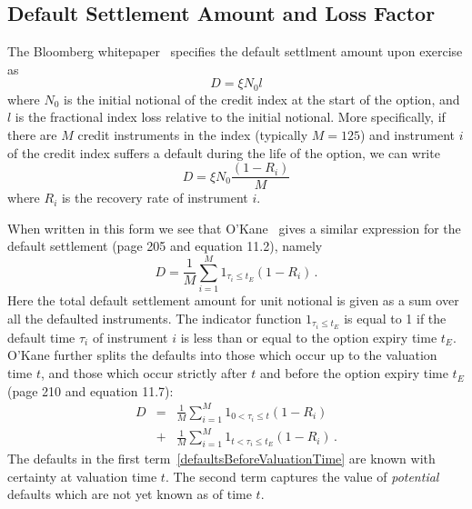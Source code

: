 \documentclass[11pt]{article}
\begin{document}
\subsection{Default Settlement Amount and Loss Factor}

The Bloomberg whitepaper~\cite{BloombergCreditIndexOption} specifies the default settlment amount upon exercise as
\begin{equation}
D = \xi N_0 l
\end{equation}
where $N_0$ is the initial notional of the credit index at the start of the option, and $l$ is the fractional index loss relative to the initial notional. More specifically, if there are $M$ credit instruments in the index (typically $M=125$) and instrument $i$ of the credit index suffers a default during the life of the option, we can write
\begin{equation}
D = \xi N_0 \frac{( 1 - R_i )}{M}
\end{equation}
where $R_i$ is the recovery rate of instrument $i$.


When written in this form we see that O'Kane~\cite{DominicOKane} gives a similar expression for the default settlement (page 205 and equation 11.2), namely
\begin{equation}
D = \frac{1}{M}\sum_{i=1}^M 1_{\tau_i\le t_E}(1-R_i)\,.
\end{equation}
Here the total default settlement amount for unit notional is given as a sum over all the defaulted instruments. The indicator function $1_{\tau_i\le t_E}$ is equal to 1 if the default time $\tau_i$ of instrument $i$ is less than or equal to the option expiry time $t_E$. O'Kane further splits the defaults into those which occur up to the valuation time $t$, and those which occur strictly after $t$ and before the option expiry time $t_E$ (page 210 and equation 11.7):
\begin{eqnarray}
D &=& \frac{1}{M}\sum_{i=1}^M 1_{0<\tau_i\le t}(1-R_i) \label{defaultsBeforeValuationTime}\\
  &+& \frac{1}{M}\sum_{i=1}^M 1_{t<\tau_i\le t_E}(1-R_i)\label{potentialDefaultsAfterValuationTime} \,.
\end{eqnarray}
The defaults in the first term~\ref{defaultsBeforeValuationTime} are known with certainty at valuation time $t$. The second term captures the value of {\em potential} defaults which are not yet known as of time $t$.
\end{document}
